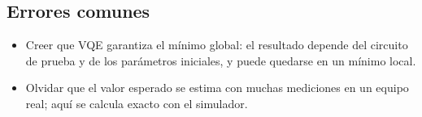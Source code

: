 \subsection{Errores comunes}
\begin{itemize}
  \item Creer que VQE garantiza el mínimo global: el resultado depende del
    circuito de prueba y de los parámetros iniciales, y puede quedarse en un
    mínimo local.
  \item Olvidar que el valor esperado se estima con muchas mediciones en un
    equipo real; aquí se calcula exacto con el simulador.
\end{itemize}


